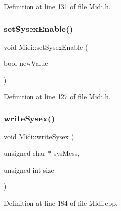 Definition at line 131 of file Midi.\+h.

\mbox{\label{class_midi_acaafd80faacb549f02be82e284663d75}} 
\subsubsection{\texorpdfstring{set\+Sysex\+Enable()}{setSysexEnable()}}
{\footnotesize\ttfamily void Midi\+::set\+Sysex\+Enable (\begin{DoxyParamCaption}\item[{bool}]{new\+Value }\end{DoxyParamCaption})\hspace{0.3cm}{\ttfamily [inline]}}



Definition at line 127 of file Midi.\+h.

\mbox{\label{class_midi_a57efc17c9561b9ca9763d610b4feea9e}} 
\subsubsection{\texorpdfstring{write\+Sysex()}{writeSysex()}}
{\footnotesize\ttfamily void Midi\+::write\+Sysex (\begin{DoxyParamCaption}\item[{unsigned char $\ast$}]{sys\+Mess,  }\item[{unsigned int}]{size }\end{DoxyParamCaption})}



Definition at line 184 of file Midi.\+cpp.

